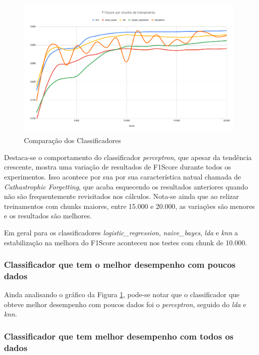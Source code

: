 \documentclass[12pt]{article}
\begin{document}
\begin{figure}[!htb]
  \centering
  \includegraphics[width=30em]{images/image_comparacao_classificadores.png}
  \caption{Comparação dos Classificadores}
  \label{fig:comparacao_classificadores}
\end{figure}

Destaca-se o comportamento do classificador \textit{perceptron}, que apesar da tendência crescente, mostra uma variação de resultados de F1Score durante todos os experimentos. Isso acontece por sua por sua característica natual chamada de \textit{Cathastrophic Forgetting}, que acaba esquecendo os resultados anteriores quando não são frequentemente revisitados nos cálculos. Nota-se ainda que ao relizar treinamentos com chunks maiores, entre 15.000 e 20.000, as variações são menores e os resultados são melhores.

Em geral para os classificadores \textit{logistic\_regression}, \textit{naive\_bayes}, \textit{lda} e \textit{knn} a estabilização na melhora do F1Score aconteceu nos testes com chunk de 10.000.

\subsubsection{Classificador que tem o melhor desempenho com poucos dados}

Ainda analisando o gráfico da Figura \ref{fig:comparacao_classificadores}, pode-se notar que o classificador que obteve melhor desempenho com poucos dados foi o \textit{perceptron}, seguido do \textit{lda} e \textit{knn}.

\subsubsection{Classificador que tem melhor desempenho com todos os dados}
\end{document}
